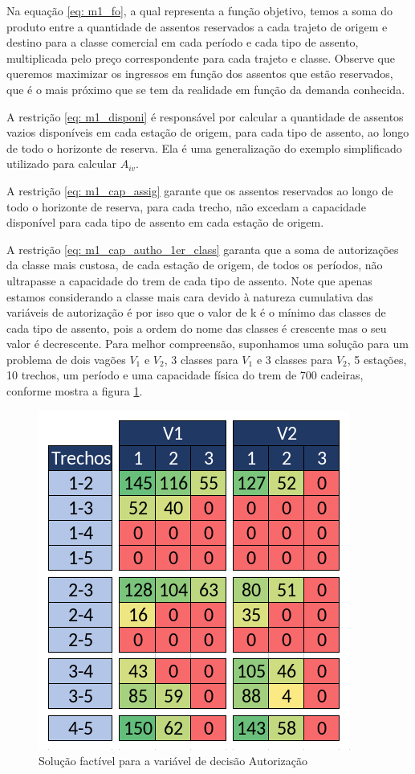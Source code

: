 Na equação \ref{eq: m1_fo}, a qual representa a função objetivo, temos a soma do produto entre a quantidade de assentos reservados a cada trajeto de origem e destino para a classe comercial em cada período e cada tipo de assento, multiplicada pelo preço correspondente para cada trajeto e classe. Observe que queremos maximizar os ingressos em função dos assentos que estão reservados, que é o mais próximo que se tem da realidade em função da demanda conhecida.

A restrição \ref{eq: m1_disponi} é responsável por calcular a quantidade de assentos vazios disponíveis em cada estação de origem, para cada tipo de assento, ao longo de todo o horizonte de reserva. Ela é uma generalização do exemplo simplificado utilizado para calcular $A_{iv}$.

A restrição \ref{eq: m1_cap_assig} garante que os assentos reservados ao longo de todo o horizonte de reserva, para cada trecho, não excedam a capacidade disponível para cada tipo de assento em cada estação de origem.

A restrição \ref{eq: m1_cap_autho_1er_class} garanta que a soma de autorizações da classe mais custosa, de cada estação de origem, de todos os períodos, não ultrapasse a capacidade do trem de cada tipo de assento. Note que apenas estamos considerando a classe mais cara devido à natureza cumulativa das variáveis de autorização é por isso que o valor de k é o mínimo das classes de cada tipo de assento, pois a ordem do nome das classes é crescente mas o seu valor é decrescente. Para melhor compreensão, suponhamos uma solução para um problema de dois vagões $V_1$ e $V_2$, 3 classes para $V_1$ e 3 classes para $V_2$, 5 estações,  10 trechos, um período e uma capacidade física do trem de 700 cadeiras, conforme mostra a figura \ref{fig: autorization}.

\begin{figure}[!ht]
	\begin{center}
		\includegraphics[scale=0.40]{img/exemplo1.png}
		\caption{Solução factível para a variável de decisão Autorização}
		\label{fig: autorization}
	\end{center}
\end{figure}

